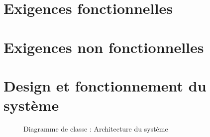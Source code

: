 \documentclass[a4paper,11pt]{report}
\begin{document}
\section{Exigences fonctionnelles}
\section{Exigences non fonctionnelles}
\section{Design et fonctionnement du système}
\begin{figure}[ht]
    \caption{Diagramme de classe : Architecture du système}
\end{figure}


\newpage

\printindex
\end{document}
